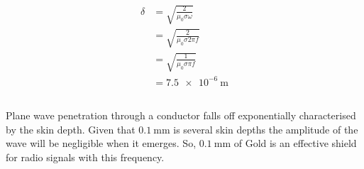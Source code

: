 \subsection{}
\begin{align*}
    \delta & = \sqrt{\frac{2}{\mu_0 \sigma \omega}}\\
    & = \sqrt{\frac{2}{\mu_0 \sigma 2 \pi f}}\\
    & = \sqrt{\frac{1}{\mu_0 \sigma \pi f}}\\
    & = \SI{7.5e-6}{\metre}
\end{align*}

\subsection{}
Plane wave penetration through a conductor falls off exponentially characterised by the skin depth. Given that $ \SI{0.1}{\milli\metre} $ is several skin depths the amplitude of the wave will be negligible when it emerges. So, $ \SI{0.1}{\milli\metre} $ of Gold is an effective shield for radio signals with this frequency.
